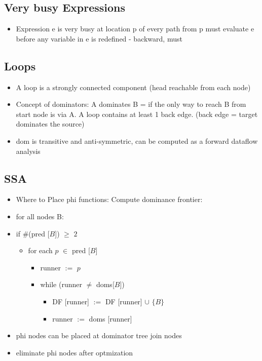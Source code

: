 \subsection*{Very busy Expressions}
\begin{itemize}
	\item Expression e is very busy at location p of every path from p must evaluate e before any variable in e is redefined - backward, must
\end{itemize}
\subsection*{Loops}
\begin{itemize}
	\item A loop is a strongly connected component (head reachable from each node)
	\item Concept of dominators: A dominates B = if the only way to reach B from start node is via A. A loop contains at least 1 back edge. (back edge = target dominates the source)
	\item dom is transitive and anti-symmetric, can be computed as a forward dataflow analysis
\end{itemize}
\subsection*{SSA}
\begin{itemize}
	\item Where to Place phi functions: Compute dominance frontier:
	\item for all nodes B:

		\item if $\#$(pred [$B$]) $\geq$ $2$
		\begin{itemize}
			\item for each $p$ $\in$ pred [$B$]
			\begin{itemize}
				\item runner $:=$ $p$
				\item while (runner $\neq$ doms[$B$])
				\begin{itemize}
					\item DF [runner] $:=$ DF [runner] $\cup$ $\{B\}$
					\item runner $:=$ doms [runner]
				\end{itemize}
			\end{itemize}
		\end{itemize}
	\item phi nodes can be placed at dominator tree join nodes
	\item eliminate phi nodes after optmization
\end{itemize}


